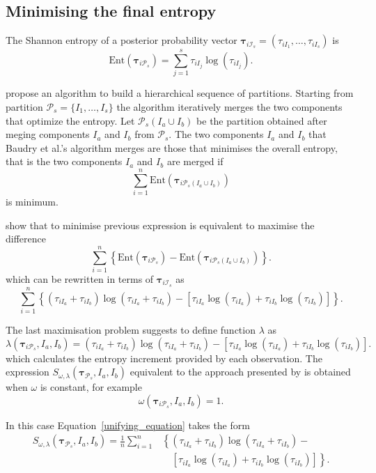 \documentclass[10pt, a4paper]{article}
\theoremstyle{definition}
\newcommand{\m}[1]{\boldsymbol{#1}}
\begin{document}
\begin{spacing}{1.9}
\subsection{Minimising the final entropy}
\label{entropy_section}

The Shannon entropy of a posterior probability vector $\m\tau_{i \mathcal{I}_s} = \left( \tau_{i I_1} , \dots, \tau_{i I_s}  \right)$ is
\[
\text{Ent}( \m\tau_{i \mathcal{P}_s} ) = \sum_{j=1}^s \tau_{i I_j}  \log(\tau_{i I_j} ).
\]


\cite{baudry2010combining} propose an algorithm to build a hierarchical sequence of partitions. Starting from partition $\mathcal{P}_s = \{ I_1, \dots, I_s\}$ the algorithm iteratively merges  the two components that optimize the entropy. Let $\mathcal{P}_s(I_a\cup I_b)$ be the partition obtained after meging components $I_a$ and $I_b$ from $\mathcal{P}_s$. The two components $I_a$ and $I_b$ that Baudry et al.'s algorithm merges are those that minimises the overall entropy, that is the two components $I_a$ and $I_b$ are merged if
\[
\sum_{i=1}^n \text{Ent}( \m\tau_{i \mathcal{P}_s(I_a\cup I_b)} )
\]
is minimum.


\cite{baudry2010combining}  show that to minimise previous expression is equivalent to maximise the difference
\[
\sum_{i=1}^n  \left\{ \text{Ent}( \m\tau_{i \mathcal{P}_s} ) - \text{Ent}( \m\tau_{i \mathcal{P}_s(I_a\cup I_b)} ) \right\}.
\]
which can be rewritten in terms of $\m\tau_{i \mathcal{I}_s}$ as
\begin{equation}\label{entropy}
\sum_{i=1}^n   \left\{(\tau_{iI_a}+\tau_{iI_b}) \log(\tau_{iI_a} + \tau_{iI_b}) - \left[\tau_{iI_a} \log(\tau_{iI_a}) + \tau_{iI_b} \log(\tau_{iI_b})\right] \right\}.
\end{equation}


The last maximisation problem suggests to define function $\lambda$ as
\[
\lambda(\m\tau_{i \mathcal{P}_s},  I_a,  I_b) =  (\tau_{iI_a}+\tau_{iI_b}) \log(\tau_{iI_a} + \tau_{iI_b}) - \left[ \tau_{iI_a} \log(\tau_{iI_a}) + \tau_{iI_b} \log(\tau_{iI_b}) \right].
\]
which calculates the entropy increment provided by each observation. The expression $S_{\omega, \lambda}( \m\tau_{\mathcal{P}_s},  I_a,  I_b) $ equivalent to the approach presented by \cite{baudry2010combining} is obtained when $\omega$ is constant, for example 
\[
\omega(\m\tau_{i \mathcal{P}_s},  I_a,  I_b) = 1.
\]

In this case Equation~\ref{unifying_equation} takes the form
\[
\begin{split}
S_{\omega, \lambda}( \m\tau_{\mathcal{P}_s},  I_a,  I_b) = \frac{1}{n} \sum_{i=1}^n & \left\{(\tau_{iI_a}+\tau_{iI_b}) \log(\tau_{iI_a} + \tau_{iI_b}) - \right.\\ 
&\quad \left.\left[ \tau_{iI_a} \log(\tau_{iI_a}) + \tau_{iI_b} \log(\tau_{iI_b}) \right]\right\}.
\end{split}
\]



\end{spacing}
\end{document}
